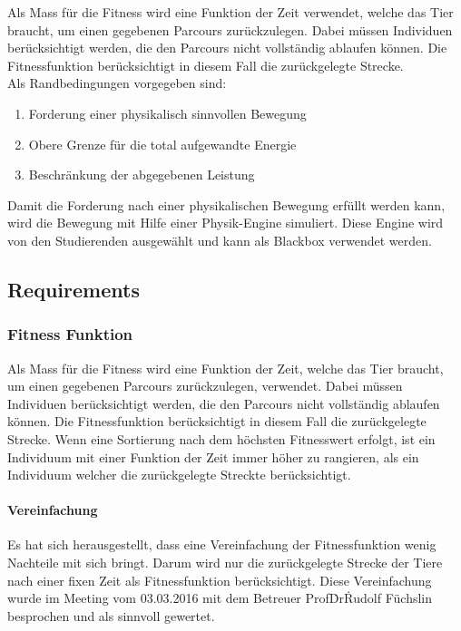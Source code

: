   Als Mass für die Fitness wird eine Funktion der Zeit verwendet, welche das Tier braucht,
  um einen gegebenen Parcours zurückzulegen.
  Dabei müssen Individuen berücksichtigt werden, die den Parcours nicht vollständig ablaufen können.
  Die Fitnessfunktion berücksichtigt in diesem Fall die zurückgelegte Strecke.
  \\
  Als Randbedingungen vorgegeben sind:
  \begin{enumerate}
    \item Forderung einer physikalisch sinnvollen Bewegung
    \item Obere Grenze für die total aufgewandte Energie
    \item Beschränkung der abgegebenen Leistung
  \end{enumerate}
  Damit die Forderung nach einer physikalischen Bewegung erfüllt werden kann,
  wird die Bewegung mit Hilfe einer Physik-Engine simuliert.
  Diese Engine wird von den Studierenden ausgewählt und kann als Blackbox verwendet werden.

  \subsection{Requirements}

    \subsubsection{Fitness Funktion}

      Als Mass für die Fitness wird eine Funktion der Zeit, welche das Tier braucht,
      um einen gegebenen Parcours zurückzulegen, verwendet.
      Dabei müssen Individuen berücksichtigt werden,
      die den Parcours nicht vollständig ablaufen können.
      Die Fitnessfunktion berücksichtigt in diesem Fall die zurückgelegte Strecke.
      Wenn eine Sortierung nach dem höchsten Fitnesswert erfolgt,
      ist ein Individuum mit einer Funktion der Zeit immer höher zu rangieren,
      als ein Individuum welcher die zurückgelegte Streckte berücksichtigt.

      \paragraph{Vereinfachung}

        Es hat sich herausgestellt, dass eine Vereinfachung der Fitnessfunktion wenig Nachteile mit sich bringt.
        Darum wird nur die zurückgelegte Strecke der Tiere nach einer fixen Zeit als Fitnessfunktion berücksichtigt.
        Diese Vereinfachung wurde im Meeting vom 03.03.2016 mit dem Betreuer Prof\. Dr\. Rudolf Füchslin besprochen
        und als sinnvoll gewertet.

